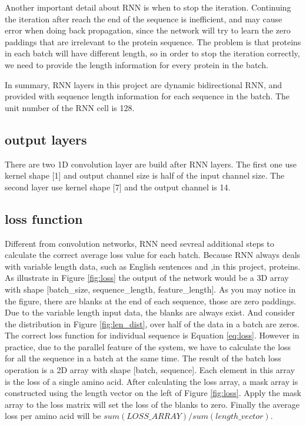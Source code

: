 Another important detail about RNN is when to stop the iteration. Continuing the iteration after reach the end of the sequence is inefficient, and may cause error when doing back propagation, since the network will try to learn the zero paddings that are irrelevant to the protein sequence. The problem is that proteins in each batch will have different length, so in order to stop the iteration correctly, we need to provide the length information for every protein in the batch.\par

In summary, RNN layers in this project are dynamic bidirectional RNN, and provided with sequence length information for each sequence in the batch. The unit number of the RNN cell is 128.

\subsection{output layers}
There are two 1D convolution layer are build after RNN layers. The first one use kernel shape [1] and output channel size is half of the input channel size. The second layer use kernel shape [7] and the output channel is 14.\par
\subsection{loss function}
Different from convolution networks, RNN need sevreal additional steps to calculate the correct average loss value for each batch. Because RNN always deals with variable length data, such as English sentences and ,in this project, proteins. As illustrate in Figure \ref{fig:loss} the output of the network would be a 3D array with shape [batch\_size, sequence\_length, feature\_length]. As you may notice in the figure, there are blanks at the end of each sequence, those are zero paddings. Due to the variable length input data, the blanks are always exist. And consider the distribution in Figure \ref{fig:len_dist}, over half of the data in a batch are zeros. The correct loss function for individual sequence is Equation \ref{eq:loss}. However in practice, due to the parallel feature of the system, we have to calculate the loss for all the sequence in a batch at the same time. The result of the batch loss operation is a 2D array with shape [batch, sequence]. Each element in this array is the loss of a single amino acid. After calculating the loss array, a mask array is constructed using the length vector on the left of Figure \ref{fig:loss}. Apply the mask array to the loss matrix will set the loss of the blanks to zero. Finally the average loss per amino acid will be $sum(LOSS\_ARRAY)/sum(length\_vector)$.\par

